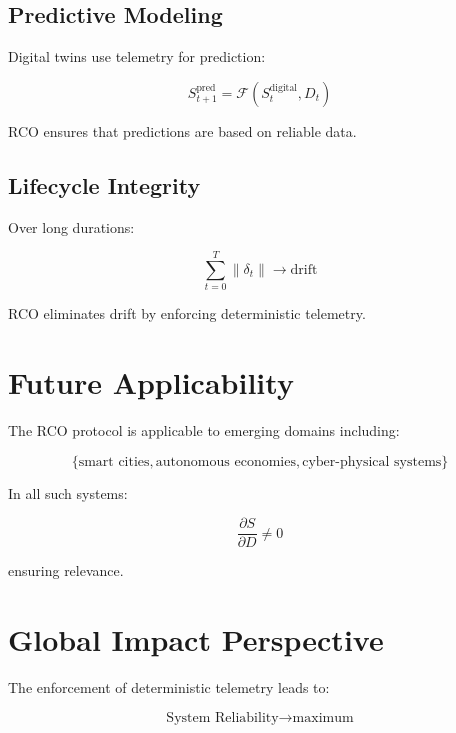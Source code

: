 \subsection{Predictive Modeling}

Digital twins use telemetry for prediction:

\begin{equation}
S_{t+1}^{\text{pred}} = \mathcal{F}(S_t^{\text{digital}}, D_t)
\end{equation}

RCO ensures that predictions are based on reliable data.

\subsection{Lifecycle Integrity}

Over long durations:

\begin{equation}
\sum_{t=0}^{T} \|\delta_t\| \rightarrow \text{drift}
\end{equation}

RCO eliminates drift by enforcing deterministic telemetry.

\section{Future Applicability}

The RCO protocol is applicable to emerging domains including:

\begin{equation}
\{\text{smart cities}, \text{autonomous economies}, \text{cyber-physical systems}\}
\end{equation}

In all such systems:

\begin{equation}
\frac{\partial S}{\partial D} \neq 0
\end{equation}

ensuring relevance.

\section{Global Impact Perspective}

The enforcement of deterministic telemetry leads to:

\begin{equation}
\text{System Reliability} \rightarrow \text{maximum}
\end{equation}

